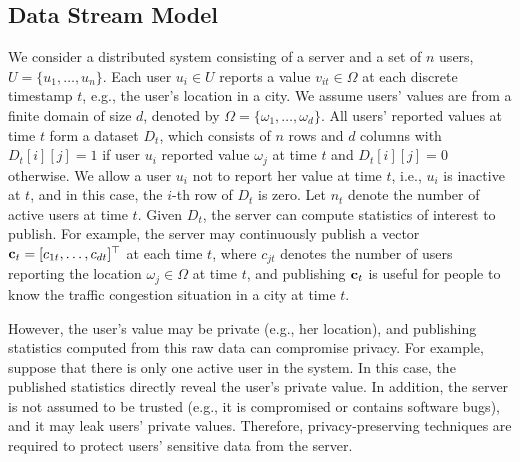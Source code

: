 \subsection{Data Stream Model}
\label{ss:data_stream}

We consider a distributed system consisting of a server and a set of $n$ users, $U=\{u_1,\ldots,u_n\}$.
Each user $u_i\in U$ reports a value $v_{it}\in\Omega$ at each discrete timestamp
$t$, e.g., the user's location in a city.
We assume users' values are from a finite domain of size $d$, denoted by
$\Omega=\{\omega_1,\ldots, \omega_d\}$.
All users' reported values at time $t$ form a dataset $D_t$, which consists of
$n$ rows and $d$ columns with $D_t[i][j]=1$ if user $u_i$ reported value
$\omega_j$ at time $t$ and $D_t[i][j]=0$ otherwise.
We allow a user $u_i$ not to report her value at time $t$, i.e., $u_i$ is
inactive at $t$, and in this case, the $i$-th row of $D_t$ is zero.
Let $n_t$ denote the number of active users at time $t$.
Given $D_t$, the server can compute statistics of interest to publish.
For example, the server may continuously publish a vector
$\mathbf{c}_t=[c_{1t},\ldots,c_{dt}]^\top$ at each time $t$, where $c_{jt}$ denotes the
number of users reporting the location $\omega_j\in\Omega$ at time $t$, and
publishing $\mathbf{c}_t$ is useful for people to know the traffic congestion situation
in a city at time $t$.

However, the user's value may be private (e.g., her location), and publishing
statistics computed from this raw data can compromise privacy.
For example, suppose that there is only one active user in the system. In this case, the
published statistics directly reveal the user's private value.
In addition, the server is not assumed to be trusted (e.g., it is compromised
or contains software bugs), and it may leak users' private values.
Therefore, privacy-preserving techniques are required to protect users'
sensitive data from the server.
